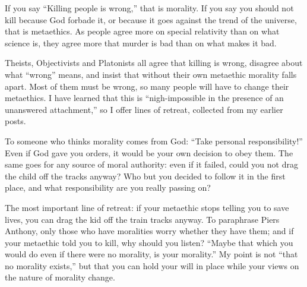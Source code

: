 
If you say ``Killing people is wrong,'' that is morality. If you say you should not kill because God forbade it, or because it goes against the trend of the universe, that is metaethics. As people agree more on special relativity than on what science is, they agree more that murder is bad than on what makes it bad.

Theists, Objectivists and Platonists all agree that killing is wrong, disagree about what ``wrong'' means, and insist that without their own metaethic morality falls apart. Most of them must be wrong, so many people will have to change their metaethics. I have learned that this is ``nigh-impossible in the presence of an unanswered attachment,'' so I offer lines of retreat, collected from my earlier posts. 

To someone who thinks morality comes from God: ``Take personal responsibility!'' Even if God gave you orders, it would be your own decision to obey them. The same goes for any source of moral authority: even if it failed, could you not drag the child off the tracks anyway? Who but you decided to follow it in the first place, and what responsibility are you really passing on? 

The most important line of retreat: if your metaethic stops telling you to save lives, you can drag the kid off the train tracks anyway. To paraphrase Piers Anthony, only those who have moralities worry whether they have them; and if your metaethic told you to kill, why should you listen? ``Maybe that which you would do even if there were no morality, is your morality.'' My point is not ``that no morality exists,'' but that you can hold your will in place while your views on the nature of morality change. 


